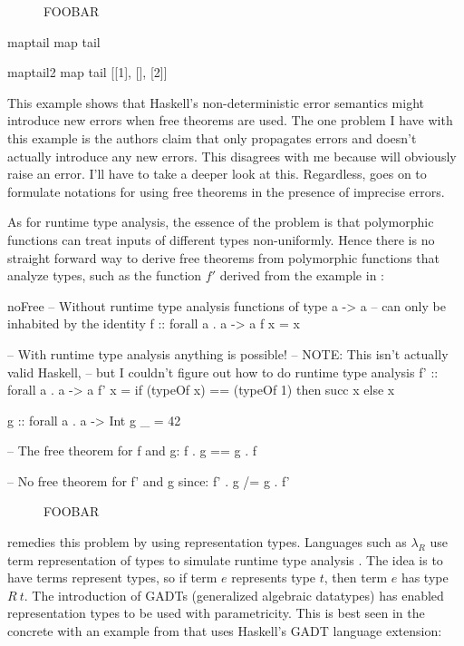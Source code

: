 \begin{figure}
  \caption{FOOBAR}
  \label{fig:imprecise}
\end{figure}

\begin{SaveVerbatim}{maptail}
map tail
\end{SaveVerbatim}
\begin{SaveVerbatim}{maptail2}
map tail [[1], [], [2]]
\end{SaveVerbatim}

This example shows that Haskell's non-deterministic error semantics might introduce new errors when free theorems are used. The one problem I have with this example is the authors claim that  only propagates errors and doesn't actually introduce any new errors. This disagrees with me because  will obviously raise an error. I'll have to take a deeper look at this. Regardless, \cite{impreciseSemantics} goes on to formulate notations for using free theorems in the presence of imprecise errors.

As for runtime type analysis, the essence of the problem is that polymorphic functions can treat inputs of different types non-uniformly. Hence there is no straight forward way to derive free theorems from polymorphic functions that analyze types, such as the function $f'$ derived from the example in \cite{vytinFree}:

\begin{SaveVerbatim}{noFree}
-- Without runtime type analysis functions of type a -> a
-- can only be inhabited by the identity
f :: forall a . a -> a
f x = x

-- With runtime type analysis anything is possible!
-- NOTE: This isn't actually valid Haskell,
-- but I couldn't figure out how to do runtime type analysis
f' :: forall a . a -> a
f' x = if (typeOf x) == (typeOf 1)
         then succ x
         else x

g :: forall a . a -> Int
g _ = 42

-- The free theorem for f and g:
f . g == g . f

-- No free theorem for f' and g since:
f' . g /= g . f'
\end{SaveVerbatim}

\begin{figure}
  \caption{FOOBAR}
  \label{fig:noFree}
\end{figure}

\cite{vytinFree} remedies this problem by using representation types. Languages such as $\lambda_R $ use term representation of types to simulate runtime type analysis \cite{erasureSemantics}. The idea is to have terms represent types, so if term $e$ represents type $t$, then term $e$ has type $R\ t$. The introduction of GADTs (generalized algebraic datatypes) has enabled representation types to be used with parametricity. This is best seen in the concrete with an example from \cite{vytinFree} that uses Haskell's GADT language extension:

